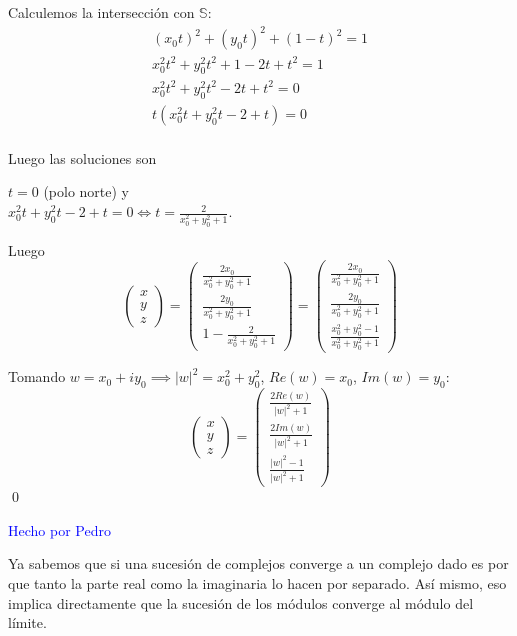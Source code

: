 \begin{problem}[1]
Calculemos la intersección con $\mathbb{S}$:
\begin{gather*}
(x_0t)^2 + (y_0t)^2 + (1-t)^2 = 1 \\
x_0^2 t^2 + y_0^2 t^2 + 1 - 2t + t^2 = 1 \\
x_0^2 t^2 + y_0^2 t^2 - 2t + t^2 = 0 \\
t ( x_0^2 t + y_0^2 t - 2 + t) = 0\\
\end{gather*}

Luego las soluciones son
\begin{center}
$t = 0$ (polo norte) y\\
$x_0^2 t + y_0^2 t - 2 + t = 0 \iff t = \frac{2}{x_0^2 + y_0^2 + 1}$.
\end{center}

Luego
\[\begin{pmatrix}x\\y\\z\end{pmatrix} = \begin{pmatrix} \frac{2x_0}{x_0^2 + y_0^2 + 1} \\ \frac{2 y_0}{x_0^2 + y_0^2 + 1} \\ 1-\frac{2}{x_0^2 + y_0^2 + 1} \end{pmatrix} = \begin{pmatrix} \frac{2x_0}{x_0^2 + y_0^2 + 1} \\ \frac{2 y_0}{x_0^2 + y_0^2 + 1} \\ \frac{x_0^2 + y_0^2 - 1}{x_0^2 + y_0^2 + 1} \end{pmatrix}\]

Tomando $w = x_0+iy_0 \implies |w|^2 = x_0^2+y_0^2$, $Re(w) = x_0$, $Im(w) = y_0$:
\[ \begin{pmatrix}x\\y\\z\end{pmatrix} = \begin{pmatrix} \frac{2Re(w)}{|w|^2 + 1} \\ \frac{2 Im(w)}{|w|^2 + 1} \\ \frac{|w|^2 - 1}{|w|^2 + 1} \end{pmatrix}\]
\qed

\textcolor{blue}{Hecho por Pedro}\\
\spart

Ya sabemos que si una sucesión de complejos converge a un complejo dado es por que tanto la parte real como la imaginaria lo hacen por separado. Así mismo, eso implica directamente que la sucesión de los módulos converge al módulo del límite.


\end{problem}
